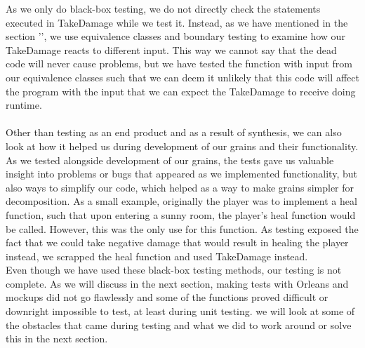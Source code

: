 As we only do black-box testing, we do not directly check the statements executed in TakeDamage while we test it. Instead, as we have mentioned in the section '', we use equivalence classes and boundary testing to examine how our TakeDamage reacts to different input. This way we cannot say that the dead code will never cause problems, but we have tested the function with input from our equivalence classes such that we can deem it unlikely that this code will affect the program with the input that we can expect the TakeDamage to receive doing runtime. \\ \\
Other than testing as an end product and as a result of synthesis, we can also look at how it helped us during development of our grains and their functionality. As we tested alongside development of our grains, the tests gave us valuable insight into problems or bugs that appeared as we implemented functionality, but also ways to simplify our code, which helped as a way to make grains simpler for decomposition. As a small example, originally the player was to implement a heal function, such that upon entering a sunny room, the player's heal function would be called. However, this was the only use for this function. As testing exposed the fact that we could take negative damage that would result in healing the player instead, we scrapped the heal function and used TakeDamage instead. \\
Even though we have used these black-box testing methods, our testing is not complete. As we will discuss in the next section, making tests with Orleans and mockups did not go flawlessly and some of the functions proved difficult or downright impossible to test, at least during unit testing. we will look at some of the obstacles that came during testing and what we did to work around or solve this in the next section. 